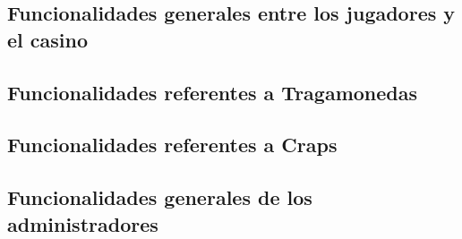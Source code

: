 \subsection{Funcionalidades generales entre los jugadores y el casino}



\subsection{Funcionalidades referentes a Tragamonedas}



\subsection{Funcionalidades referentes a Craps}



\subsection{Funcionalidades generales de los administradores}

